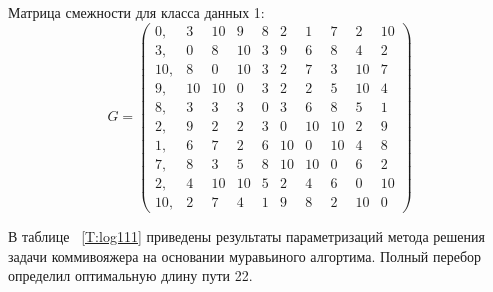 Матрица смежности для класса данных 1:
\begin{equation*}
	G = \begin{pmatrix}
		0,      &3      &10     &9      &8      &2      &1      &7      &2      &10     \\
		3,      &0      &8      &10     &3      &9      &6      &8      &4      &2      \\
		10,     &8      &0      &10     &3      &2      &7      &3      &10     &7      \\
		9,      &10     &10     &0      &3      &2      &2      &5      &10     &4      \\
		8,      &3      &3      &3      &0      &3      &6      &8      &5      &1      \\
		2,      &9      &2      &2      &3      &0      &10     &10     &2      &9      \\
		1,      &6      &7      &2      &6      &10     &0      &10     &4      &8      \\
		7,      &8      &3      &5      &8      &10     &10     &0      &6      &2      \\
		2,      &4      &10     &10     &5      &2      &4      &6      &0      &10     \\
		10,     &2      &7      &4      &1      &9      &8      &2      &10     &0
	\end{pmatrix}
\end{equation*}

В таблице ~\ref{T:log111} приведены результаты параметризаций метода решения задачи коммивояжера на основании муравьиного алгортима. Полный перебор определил оптимальную длину пути 22.

